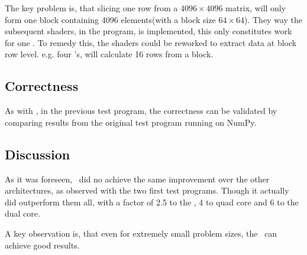 The key problem is, that slicing one row from a $4096 \times 4096$
matrix, will only form one block containing 4096 elements(with a block
size $64 \times 64$). They way the subsequent shaders, in the program,
is implemented, this only constitutes work for one \SPE{}. To remedy
this, the shaders could be reworked to extract data at block row
level. e.g. four \SPE{}'s, will calculate 16 rows from a block.

\subsection{Correctness}

As with , in the previous test program, the
correctness can be validated by comparing results from the original
test program running on NumPy.

\subsection{Discussion}

As it was foreseen, \SOR\ did no achieve the same improvement over the
other architectures, as observed with the two first test
programs. Though it actually did outperform them all, with a factor of
2.5 to the \PPE{}, 4 to quad core and 6 to the dual core.

A key observation is, that even for extremely small problem sizes,
the \CBE\ can achieve good results.
